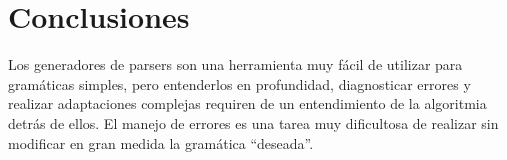 \section{Conclusiones}
Los generadores de parsers son una herramienta muy fácil de utilizar para gramáticas simples, pero entenderlos en profundidad, diagnosticar errores y realizar adaptaciones complejas requiren de un entendimiento de la algoritmia detrás de ellos. El manejo de errores es una tarea muy dificultosa de realizar sin modificar en gran medida la gramática ``deseada''.